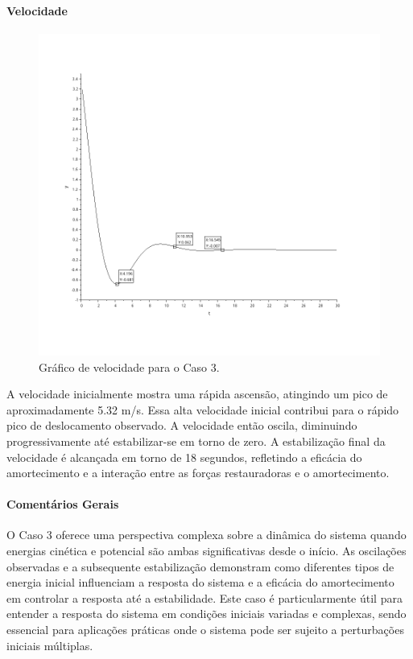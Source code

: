 \paragraph{Velocidade}
\begin{figure}[H]
    \centering
    \includegraphics[height=0.7\textwidth]{atividades/2-atividade/assets/velocidade-caso-3.png}
    \caption{Gráfico de velocidade para o Caso 3.}
\end{figure}
A velocidade inicialmente mostra uma rápida ascensão, atingindo um pico de aproximadamente 5.32 m/s. Essa alta velocidade inicial contribui para o rápido pico de deslocamento observado. A velocidade então oscila, diminuindo progressivamente até estabilizar-se em torno de zero. A estabilização final da velocidade é alcançada em torno de 18 segundos, refletindo a eficácia do amortecimento e a interação entre as forças restauradoras e o amortecimento.

\paragraph{Comentários Gerais}
O Caso 3 oferece uma perspectiva complexa sobre a dinâmica do sistema quando energias cinética e potencial são ambas significativas desde o início. As oscilações observadas e a subsequente estabilização demonstram como diferentes tipos de energia inicial influenciam a resposta do sistema e a eficácia do amortecimento em controlar a resposta até a estabilidade. Este caso é particularmente útil para entender a resposta do sistema em condições iniciais variadas e complexas, sendo essencial para aplicações práticas onde o sistema pode ser sujeito a perturbações iniciais múltiplas.

